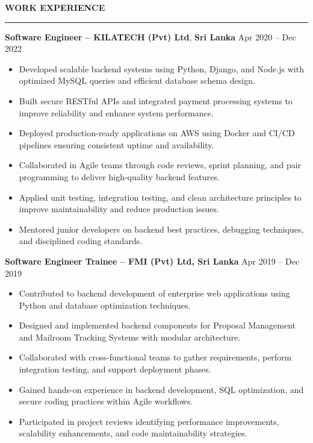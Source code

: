 \documentclass[10pt,letterpaper]{article}
\begin{document}
\vspace{8pt}

\textbf{WORK EXPERIENCE}\\[-8pt]
\noindent\rule{\textwidth}{1pt}

\vspace{-2pt}

\textbf{Software Engineer -- KILATECH (Pvt) Ltd}, \textbf{Sri Lanka} \hfill Apr 2020 -- Dec 2022

\vspace{-1pt}

\begin{itemize}
\item Developed scalable backend systems using Python, Django, and Node.js with optimized MySQL queries and efficient database schema design.
\item Built secure RESTful APIs and integrated payment processing systems to improve reliability and enhance system performance.
\item Deployed production-ready applications on AWS using Docker and CI/CD pipelines ensuring consistent uptime and availability.
\item Collaborated in Agile teams through code reviews, sprint planning, and pair programming to deliver high-quality backend features.
\item Applied unit testing, integration testing, and clean architecture principles to improve maintainability and reduce production issues.
\item Mentored junior developers on backend best practices, debugging techniques, and disciplined coding standards.
\end{itemize}

\textbf{Software Engineer Trainee -- FMI (Pvt) Ltd, Sri Lanka} \hfill Apr 2019 -- Dec 2019

\vspace{-1pt}

\begin{itemize}
\item Contributed to backend development of enterprise web applications using Python and database optimization techniques.
\item Designed and implemented backend components for Proposal Management and Mailroom Tracking Systems with modular architecture.
\item Collaborated with cross-functional teams to gather requirements, perform integration testing, and support deployment phases.
\item Gained hands-on experience in backend development, SQL optimization, and secure coding practices within Agile workflows.
\item Participated in project reviews identifying performance improvements, scalability enhancements, and code maintainability strategies.
\end{itemize}
\end{document}
